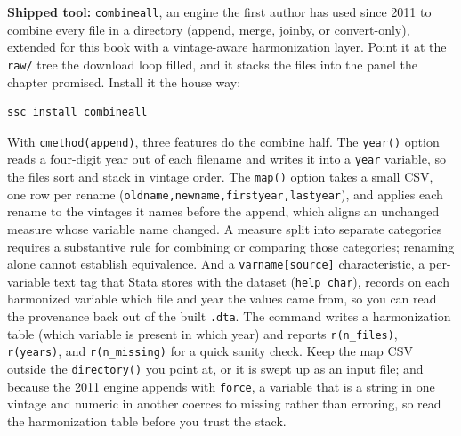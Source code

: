\begin{kaobox}[frametitle=Package Integration: \texttt{combineall}]
\textbf{Shipped tool:} \texttt{combineall}, an engine the first author has used since 2011 to combine every file in a directory (append, merge, joinby, or convert-only), extended for this book with a vintage-aware harmonization layer. Point it at the \texttt{raw/} tree the download loop filled, and it stacks the files into the panel the chapter promised. Install it the house way:
\par
{\footnotesize
\begin{verbatim}
ssc install combineall
\end{verbatim}
}
With \texttt{cmethod(append)}, three features do the combine half. The \texttt{year()} option reads a four-digit year out of each filename and writes it into a \texttt{year} variable, so the files sort and stack in vintage order. The \texttt{map()} option takes a small CSV, one row per rename (\texttt{oldname,newname,firstyear,lastyear}), and applies each rename to the vintages it names before the append, which aligns an unchanged measure whose variable name changed. A measure split into separate categories requires a substantive rule for combining or comparing those categories; renaming alone cannot establish equivalence. And a \texttt{varname[source]} characteristic, a per-variable text tag that Stata stores with the dataset (\texttt{help char}), records on each harmonized variable which file and year the values came from, so you can read the provenance back out of the built \texttt{.dta}. The command writes a harmonization table (which variable is present in which year) and reports \texttt{r(n\_files)}, \texttt{r(years)}, and \texttt{r(n\_missing)} for a quick sanity check. Keep the map CSV outside the \texttt{directory()} you point at, or it is swept up as an input file; and because the 2011 engine appends with \texttt{force}, a variable that is a string in one vintage and numeric in another coerces to missing rather than erroring, so read the harmonization table before you trust the stack.
\end{kaobox}

